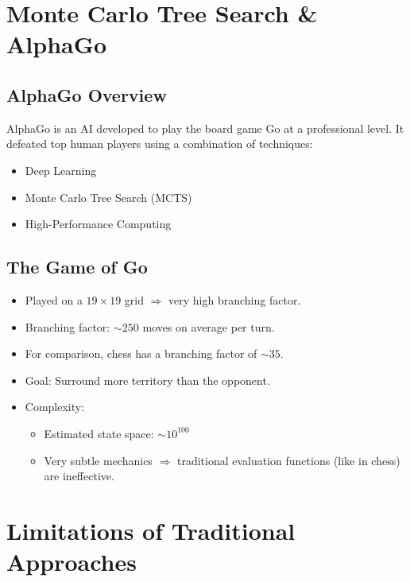 \section{Monte Carlo Tree Search \& AlphaGo}

\subsection{AlphaGo Overview}
AlphaGo is an AI developed to play the board game Go at a professional level.  
It defeated top human players using a combination of techniques:
\begin{itemize}
    \item Deep Learning
    \item Monte Carlo Tree Search (MCTS)
    \item High-Performance Computing
\end{itemize}

\subsection{The Game of Go}
\begin{itemize}
    \item Played on a $19 \times 19$ grid $\Rightarrow$ very high branching factor.
    \item Branching factor: $\sim 250$ moves on average per turn.
    \item For comparison, chess has a branching factor of $\sim 35$.
    \item Goal: Surround more territory than the opponent.
    \item Complexity: 
    \begin{itemize}
        \item Estimated state space: $\sim 10^{100}$
        \item Very subtle mechanics $\Rightarrow$ traditional evaluation functions (like in chess) are ineffective.
    \end{itemize}
\end{itemize}

\section{Limitations of Traditional Approaches}

